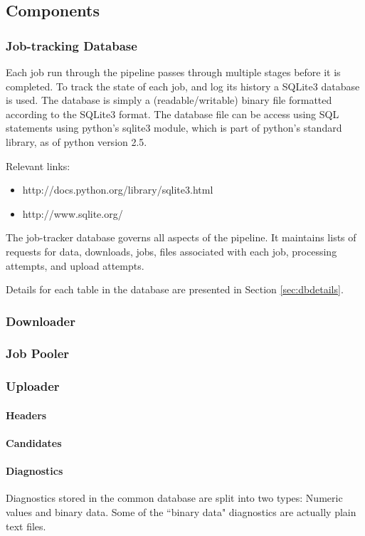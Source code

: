 \subsection{Components}
\subsubsection{Job-tracking Database}
Each job run through the pipeline passes through multiple stages before it is completed. To track the state of each job, and log its history a SQLite3 database is used. The database is simply a (readable/writable) binary file formatted according to the SQLite3 format. The database file can be access using SQL statements using python's sqlite3 module, which is part of python's standard library, as of python version 2.5.

Relevant links:
\begin{itemize}
    \item http://docs.python.org/library/sqlite3.html
    \item http://www.sqlite.org/
\end{itemize}

The job-tracker database governs all aspects of the pipeline. It maintains lists of requests for data, downloads, jobs, files associated with each job, processing attempts, and upload attempts.

Details for each table in the database are presented in Section \ref{sec:dbdetails}.

\subsubsection{Downloader}
\subsubsection{Job Pooler}
\subsubsection{Uploader}
\paragraph{Headers}

\paragraph{Candidates}

\paragraph{Diagnostics}
Diagnostics stored in the common database are split into two types: Numeric values and binary data. Some of the ``binary data" diagnostics are actually plain text files.

